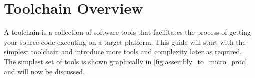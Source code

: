 \chapter{Toolchain Overview}
A toolchain is a collection of software tools that facilitates the process of getting your source code executing on a target platform. This guide will start with the simplest toolchain and introduce more tools and complexity later as required. The simplest set of tools is shown graphically in \autoref{fig:assembly_to_micro_proc} and will now be discussed.

